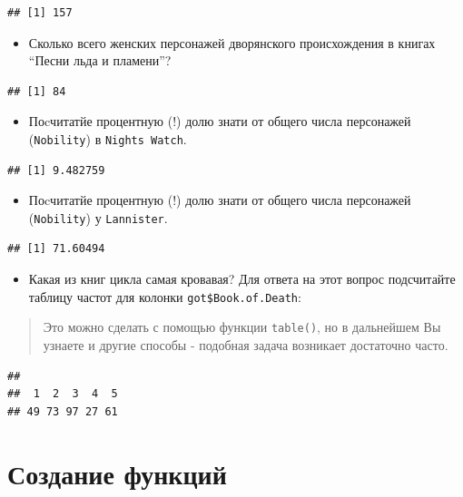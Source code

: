 \documentclass[]{book}
\providecommand{\tightlist}{%
  \setlength{\itemsep}{0pt}\setlength{\parskip}{0pt}}
\begin{document}
\begin{verbatim}
## [1] 157
\end{verbatim}

\begin{itemize}
\tightlist
\item
  Сколько всего женских персонажей дворянского происхождения в книгах
  ``Песни льда и пламени''?
\end{itemize}

\begin{verbatim}
## [1] 84
\end{verbatim}

\begin{itemize}
\tightlist
\item
  Поcчитатйе процентную (!) долю знати от общего числа персонажей
  (\texttt{Nobility}) в \texttt{Night\textquotesingle{}s\ Watch}.
\end{itemize}

\begin{verbatim}
## [1] 9.482759
\end{verbatim}

\begin{itemize}
\tightlist
\item
  Поcчитатйе процентную (!) долю знати от общего числа персонажей
  (\texttt{Nobility}) у \texttt{Lannister}.
\end{itemize}

\begin{verbatim}
## [1] 71.60494
\end{verbatim}

\begin{itemize}
\tightlist
\item
  Какая из книг цикла самая кровавая? Для ответа на этот вопрос
  подсчитайте таблицу частот для колонки \texttt{got\$Book.of.Death}:
\end{itemize}

\begin{quote}
Это можно сделать с помощью функции \texttt{table()}, но в дальнейшем Вы
узнаете и другие способы - подобная задача возникает достаточно часто.
\end{quote}

\begin{verbatim}
## 
##  1  2  3  4  5 
## 49 73 97 27 61
\end{verbatim}

\section{Создание функций}\label{task_function}
\end{document}
